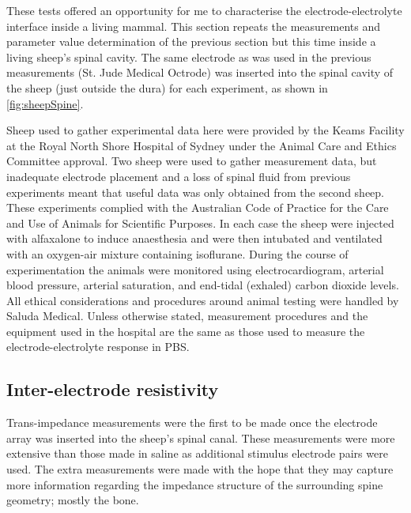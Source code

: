  These tests offered an opportunity for me to characterise the electrode-electrolyte interface inside a living mammal.
  This section repeats the measurements and parameter value determination of the previous section but this time inside a living sheep's spinal cavity.
  The same electrode as was used in the previous measurements (St. Jude Medical Octrode) was inserted into the spinal cavity of the sheep (just outside the dura) for each experiment, as shown in \cref{fig:sheepSpine}.

  Sheep used to gather experimental data here were provided by the Keams Facility at the Royal North Shore Hospital of Sydney under the Animal Care and Ethics Committee approval.
  \label{edit:newSentence}Two sheep were used to gather measurement data, but inadequate electrode placement and a loss of spinal fluid from previous experiments meant that useful data was only obtained from the second sheep.
  These experiments complied with the Australian Code of Practice for the Care and Use of Animals for Scientific Purposes.
  In each case the sheep were injected with alfaxalone to induce anaesthesia and were then intubated and ventilated with an oxygen-air mixture containing isoflurane.
  During the course of experimentation the animals were monitored using electrocardiogram, arterial blood pressure, arterial saturation, and end-tidal (exhaled) carbon dioxide levels.
  All ethical considerations and procedures around animal testing were handled by Saluda Medical.
  Unless otherwise stated, measurement procedures and the equipment used in the hospital are the same as those used to measure the electrode-electrolyte response in PBS.

  \subsection{Inter-electrode resistivity}

    Trans-impedance measurements were the first to be made once the electrode array was inserted into the sheep's spinal canal.
    These measurements were more extensive than those made in saline as additional stimulus electrode pairs were used.
    The extra measurements were made with the hope that they may capture more information regarding the impedance structure of the surrounding spine geometry; mostly the bone.


